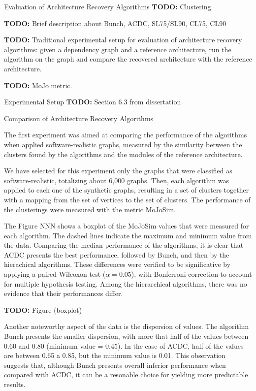\documentclass[11pt,twocolumn,a4paper,english]{article}
\newcommand{\TODO}{\textbf{TODO:} }
\begin{document}
\begin{section}{Evaluation of Architecture Recovery Algorithms}
	\TODO Clustering

	\TODO Brief description about Bunch, ACDC, SL75/SL90, CL75, CL90
	
	\TODO Traditional experimental setup for evaluation of architecture recovery algorithms: given a dependency graph and a reference architecture, run the algorithm on the graph and compare the recovered architecture with the reference architecture.
	
	\TODO MoJo metric.

\begin{subsection}{Experimental Setup}
	\TODO Section 6.3 from dissertation
\end{subsection}

\begin{subsection}{Comparison of Architecture Recovery Algorithms}
	
	The first experiment was aimed at comparing the performance of the algorithms when applied software-realistic graphs, measured by the similarity between the clusters found by the algorithms and the modules of the reference architecture.
	
	We have selected for this experiment only the graphs that were classified as software-realistic, totalizing about 6,000 graphs. Then, each algorithm was applied to each one of the synthetic graphs, resulting in a set of clusters together with a mapping from the set of vertices to the set of clusters. The performance of the clusterings were measured with the metric MoJoSim.
	
	The Figure NNN shows a boxplot of the MoJoSim values that were measured for each algorithm. The dashed lines indicate the maximum and minimum value from the data. Comparing the median performance of the algorithms, it is clear that ACDC presents the best performance, followed by Bunch, and then by the hierachical algorithms. These differences were verified to be significative by applying a paired Wilcoxon test ($\alpha = 0.05$), with Bonferroni correction to account for multiple hypothesis testing. Among the hierarchical algorithms, there was no evidence that their performances differ.
	
	\TODO Figure (boxplot)
	
	Another noteworthy aspect of the data is the dispersion of values. The algorithm Bunch presents the smaller dispersion, with more that half of the values between 0.60 and 0.80 (minimum value = 0.45). In the case of ACDC, half of the values are between 0.65 a 0.85, but the minimum value is 0.01. This observation suggests that, although Bunch presents overall inferior performance when compared with ACDC, it can be a resonable choice for yielding more predictable results.
	

\end{subsection}
\end{section}
\end{document}
